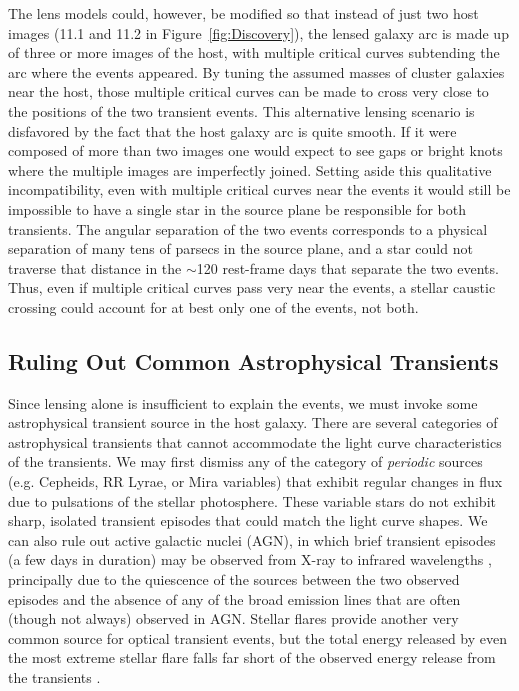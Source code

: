 The lens models could, however, be modified so that instead of just
two host images (11.1 and 11.2 in Figure~\ref{fig:Discovery}), the
lensed galaxy arc is made up of three or more images of the host, with
multiple critical curves subtending the arc where the \spock events
appeared.  By tuning the assumed masses of cluster galaxies near the
\spock host, those multiple critical curves can be made to cross very
close to the positions of the two \spock transient events. This
alternative lensing scenario is disfavored by the fact that the host
galaxy arc is quite smooth. If it were composed of more than two
images one would expect to see gaps or bright knots where the multiple
images are imperfectly joined.  Setting aside this qualitative
incompatibility, even with multiple critical curves near the \spock
events it would still be impossible to have a single star in the
source plane be responsible for both transients. The angular
separation of the two \spock events corresponds to a physical
separation of many tens of parsecs in the source plane, and a star
could not traverse that distance in the $\sim$120 rest-frame days that
separate the two \spock events.  Thus, even if multiple critical
curves pass very near the \spock events, a stellar caustic crossing
could account for at best only one of the \spock events, not both.


\subsection{Ruling Out Common Astrophysical Transients}

Since lensing alone is insufficient to explain the \spock events, we
must invoke some astrophysical transient source in the host galaxy.
There are several categories of astrophysical transients that cannot
accommodate the light curve characteristics of the \spock transients.
We may first dismiss any of the category of {\it periodic} sources
(e.g. Cepheids, RR Lyrae, or Mira variables) that exhibit regular
changes in flux due to pulsations of the stellar photosphere. These
variable stars do not exhibit sharp, isolated transient episodes that
could match the \spock light curve shapes. We can also rule out active
galactic nuclei (AGN), in which brief transient episodes (a few days
in duration) may be observed from X-ray to infrared wavelengths
\citep[e.g.][]{Gaskell:2003}, principally due to the quiescence of the
\spock sources between the two observed episodes and the absence of
any of the broad emission lines that are often (though not always)
observed in AGN. Stellar flares provide another very common source for
optical transient events, but the total energy released by even the
most extreme stellar flare falls far short of the observed energy
release from the \spock transients \citep{Balona:2012,Karoff:2016} .

